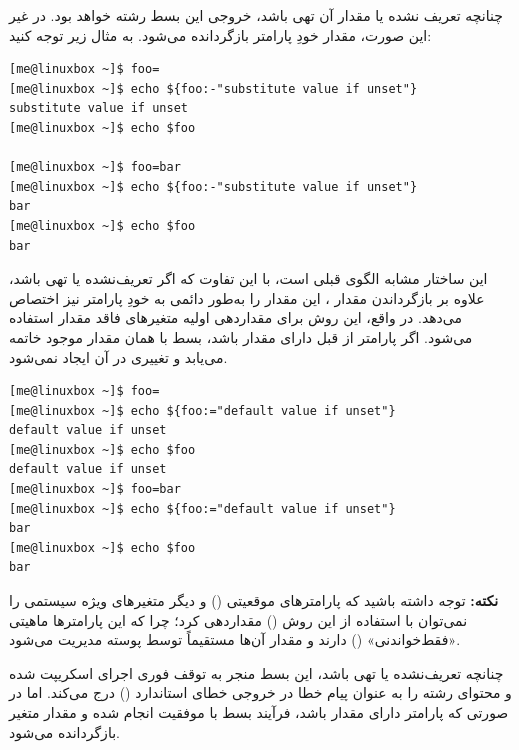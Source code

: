 \textbf{}

چنانچه  تعریف نشده یا مقدار آن تهی باشد، خروجی این بسط رشته  خواهد بود. در غیر این صورت، مقدار خودِ پارامتر بازگردانده می‌شود. به مثال زیر توجه کنید:

\begin{latin}
\begin{lstlisting}
[me@linuxbox ~]$ foo=
[me@linuxbox ~]$ echo ${foo:-"substitute value if unset"}
substitute value if unset
[me@linuxbox ~]$ echo $foo

[me@linuxbox ~]$ foo=bar
[me@linuxbox ~]$ echo ${foo:-"substitute value if unset"}
bar
[me@linuxbox ~]$ echo $foo
bar
\end{lstlisting}
\end{latin}

\textbf{}

این ساختار مشابه الگوی قبلی است، با این تفاوت که اگر  تعریف‌نشده یا تهی باشد، علاوه بر بازگرداندن مقدار ، این مقدار را به‌طور دائمی به خودِ پارامتر نیز اختصاص می‌دهد. در واقع، این روش برای مقداردهی اولیه متغیرهای فاقد مقدار استفاده می‌شود. اگر پارامتر از قبل دارای مقدار باشد، بسط با همان مقدار موجود خاتمه می‌یابد و تغییری در آن ایجاد نمی‌شود.

\begin{latin}
\begin{lstlisting}
[me@linuxbox ~]$ foo=
[me@linuxbox ~]$ echo ${foo:="default value if unset"}
default value if unset
[me@linuxbox ~]$ echo $foo
default value if unset
[me@linuxbox ~]$ foo=bar
[me@linuxbox ~]$ echo ${foo:="default value if unset"}
bar
[me@linuxbox ~]$ echo $foo
bar
\end{lstlisting}
\end{latin}

\begin{note}
\textbf{نکته:} توجه داشته باشید که پارامترهای موقعیتی () و دیگر متغیرهای ویژه سیستمی را نمی‌توان با استفاده از این روش (\cmd{:=}) مقداردهی کرد؛ چرا که این پارامترها ماهیتی «فقط‌خواندنی» () دارند و مقدار آن‌ها مستقیماً توسط پوسته مدیریت می‌شود.
\end{note}

\textbf{}

چنانچه  تعریف‌نشده یا تهی باشد، این بسط منجر به توقف فوری اجرای اسکریپت شده و محتوای رشته  را به عنوان پیام خطا در خروجی خطای استاندارد () درج می‌کند. اما در صورتی که پارامتر دارای مقدار باشد، فرآیند بسط با موفقیت انجام شده و مقدار متغیر بازگردانده می‌شود.

